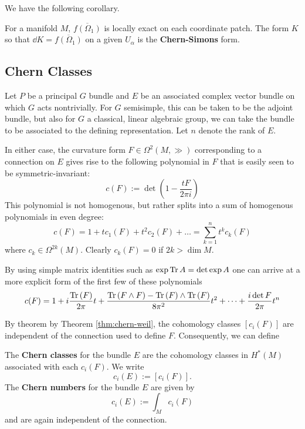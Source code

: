 		We have the following corollary. 
		\begin{cor}
			For a manifold $M$, $\overline{f(\Omega_1)}$ is locally exact on each coordinate patch. The form $K$ so that $\dd K = \overline{f(\Omega_1)}$ on a given $U_\alpha$ is the \textbf{Chern-Simons} form.
		\end{cor}
		
		\subsection{Chern Classes}
		
		Let $P$ be a principal $G$ bundle and $E$ be an associated complex vector bundle on which $G$ acts nontrivially. For $G$ semisimple, this can be taken to be the adjoint bundle, but also for $G$ a classical, linear algebraic group, we can take the bundle to be associated to the defining representation. Let $n$ denote the rank of $E$.
		
		In either case, the curvature form $F \in \Omega^2(M, \gg)$ corresponding to a connection on $E$ gives rise to the following polynomial in $F$ that is easily seen to be symmetric-invariant:
		\begin{equation}
			c(F) := \det(1 - \frac{t F}{2\pi i})
		\end{equation}
		This polynomial is not homogenous, but rather splits into a sum of homogenous polynomials in even degree:
		\begin{equation}
			c(F) = 1 + t c_1(F) + t^2 c_2(F) + \dots = \sum_{k=1}^n t^k c_k(F)
		\end{equation}
		where $c_k \in \Omega^{2k}(M)$. Clearly $c_k(F) = 0$ if $2k > \dim M$.
		
		By using simple matrix identities such as $\exp{\mathrm{Tr}\,A} = \det \exp A$ one can arrive at a more explicit form of the first few of these polynomials
		\[
			c(F) = 1 + i \frac{\mathrm{Tr}\,(F)}{2\pi} t + \frac{\mathrm{Tr}\,(F \wedge F) - \mathrm{Tr}\,(F) \wedge \mathrm{Tr}\,(F)}{8\pi^2} t^2 + \dots + \frac{i \det F}{2\pi} t^n
		\]
		
		 By theorem by Theorem \ref{thm:chern-weil}, the cohomology classes $[c_i(F)]$ are independent of the connection used to define $F$. Consequently, we can define 
		 \begin{defn} \label{defn:chern}
		 	The \textbf{Chern classes} for the bundle $E$ are the cohomology classes in $H^*(M)$ associated with each $c_i(F)$. We write 
			\[
				c_i(E) := [c_i (F)].
			\]
			The \textbf{Chern numbers} for the bundle $E$ are given by
			\[
				c_i(E) := \int_{M} c_i(F)
			\]
			and are again independent of the connection. 
		 \end{defn}
		 
